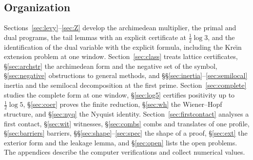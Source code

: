 \documentclass[11pt]{amsart}
\theoremstyle{definition}
\theoremstyle{remark}
\begin{document}
\subsection{Organization}
Sections~\ref{sec:levy}--\ref{sec:Z} develop the archimedean multiplier, the primal and dual programs, the tail
lemmas with an explicit certificate at $\frac12\log3$, and the identification of the dual variable with the
explicit formula, including the Kre\u{\i}n extension problem at one window. Section~\ref{sec:class} treats lattice
certificates, \S\ref{sec:archstr} the archimedean form and the negative set of the symbol, \S\ref{sec:negative}
obstructions to general methods, and \S\S\ref{sec:inertia}--\ref{sec:semilocal} inertia and the semilocal
decomposition at the first prime. Section~\ref{sec:complete} studies the complete form at one window,
\S\ref{sec:log5} certifies positivity up to $\frac12\log5$, \S\ref{sec:coer} proves the finite reduction,
\S\ref{sec:wh} the Wiener--Hopf structure, and \S\ref{sec:nyq} the Nyquist identity. Section~\ref{sec:firstcontact}
analyses a first contact, \S\ref{sec:wit} witnesses, \S\ref{sec:combs} combs and translates of one profile,
\S\ref{sec:barriers} barriers, \S\S\ref{sec:shape}--\ref{sec:spec} the shape of a proof, \S\ref{sec:ext} the exterior form and the
leakage lemma, and \S\ref{sec:open} lists the
open problems. The appendices describe the computer verifications and collect numerical values.
\end{document}

